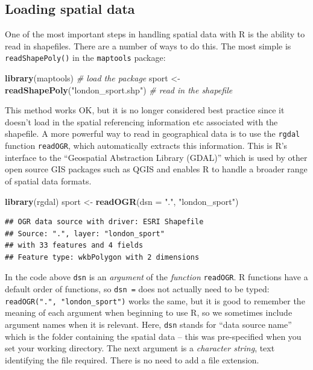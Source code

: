 \documentclass[]{article}
\newenvironment{Shaded}{}{}
\newcommand{\KeywordTok}[1]{\textcolor[rgb]{0.00,0.44,0.13}{\textbf{{#1}}}}
\newcommand{\DataTypeTok}[1]{\textcolor[rgb]{0.56,0.13,0.00}{{#1}}}
\newcommand{\StringTok}[1]{\textcolor[rgb]{0.25,0.44,0.63}{{#1}}}
\newcommand{\CommentTok}[1]{\textcolor[rgb]{0.38,0.63,0.69}{\textit{{#1}}}}
\newcommand{\NormalTok}[1]{{#1}}
\begin{document}
\subsection{Loading spatial data}

One of the most important steps in handling spatial data with R is the
ability to read in shapefiles. There are a number of ways to do this.
The most simple is \texttt{readShapePoly()} in the \texttt{maptools}
package:

\begin{Shaded}
\begin{Highlighting}[]
\KeywordTok{library}\NormalTok{(maptools)  }\CommentTok{# load the package}
\NormalTok{sport <- }\KeywordTok{readShapePoly}\NormalTok{(}\StringTok{"london_sport.shp"}\NormalTok{)  }\CommentTok{# read in the shapefile}
\end{Highlighting}
\end{Shaded}
This method works OK, but it is no longer considered best practice since
it doesn't load in the spatial referencing information etc associated
with the shapefile. A more powerful way to read in geographical data is
to use the \texttt{rgdal} function \texttt{readOGR}, which automatically
extracts this information. This is R's interface to the ``Geospatial
Abstraction Library (GDAL)'' which is used by other open source GIS
packages such as QGIS and enables R to handle a broader range of spatial
data formats.

\begin{Shaded}
\begin{Highlighting}[]
\KeywordTok{library}\NormalTok{(rgdal)}
\NormalTok{sport <- }\KeywordTok{readOGR}\NormalTok{(}\DataTypeTok{dsn =} \StringTok{"."}\NormalTok{, }\StringTok{"london_sport"}\NormalTok{)}
\end{Highlighting}
\end{Shaded}
\begin{verbatim}
## OGR data source with driver: ESRI Shapefile 
## Source: ".", layer: "london_sport"
## with 33 features and 4 fields
## Feature type: wkbPolygon with 2 dimensions
\end{verbatim}
In the code above \texttt{dsn} is an \emph{argument} of the
\emph{function} \texttt{readOGR}. R functions have a default order of
functions, so \texttt{dsn =} does not actually need to be typed:
\texttt{readOGR(".", "london\_sport")} works the same, but it is good to
remember the meaning of each argument when beginning to use R, so we
sometimes include argument names when it is relevant. Here, \texttt{dsn}
stands for ``data source name'' which is the folder containing the
spatial data -- this was pre-specified when you set your working
directory. The next argument is a \emph{character string}, text
identifying the file required. There is no need to add a file extension.
\end{document}
